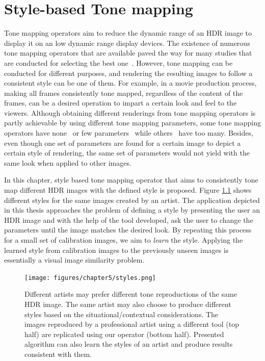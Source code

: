 \chapter{Style-based Tone mapping}
\label{chp:b4}


Tone mapping operators aim to reduce the dynamic range of an HDR image to display it on an low dynamic range display devices. The existence of numerous tone mapping operators that are available paved the way for many studies that are conducted for selecting the best one~\cite{parraga2018tone}. However, tone mapping can be conducted for different purposes, and rendering the resulting images to follow a consistent style can be one of them. For example, in a movie production process, making all frames consistently tone mapped, regardless of the content of the frames, can be a desired operation to impart a certain look and feel to the viewers. Although obtaining different renderings from tone mapping operators is partly achievable by using different tone mapping parameters, some tone mapping operators have none~\cite{Dura02} or few parameters~\cite{Fatt02} while others~\cite{Photomatix2010} have too many. Besides, even though one set of parameters are found for a certain image to depict a certain style of rendering, the same set of parameters would not yield with the same look when applied to other images. %

In this chapter, style based tone mapping operator that aims to consistently tone map different HDR images with the defined style is proposed. Figure \ref{fig:styles} shows different styles for the same images created by an artist. The application depicted in this thesis approaches the problem of defining a style by presenting the user an HDR image and with the help of the tool developed, ask the user to change the parameters until the image matches the desired look. By repeating this process for a small set of calibration images, we aim to \emph{learn} the style. Applying the learned style from calibration images to the previously unseen images is essentially a visual image similarity problem.

\begin{figure}
\begin{center}
\texttt{[image: figures/chapter5/styles.png]}
\caption{Different artists may prefer different tone reproductions of the same HDR image. The same artist may also choose to produce different styles based on the situational/contextual considerations. The images reproduced by a professional artist using a different tool (top half) are replicated using our operator (bottom half). Presented algorithm can also learn the styles of an artist and produce results consistent with them.}
\label{fig:styles}
\end{center}
\end{figure}

